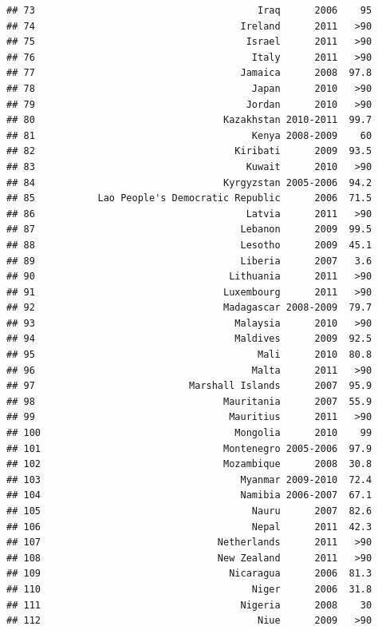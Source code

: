 \documentclass[
]{book}
\begin{document}
\begin{verbatim}
## 73                                       Iraq      2006    95
## 74                                    Ireland      2011   >90
## 75                                     Israel      2011   >90
## 76                                      Italy      2011   >90
## 77                                    Jamaica      2008  97.8
## 78                                      Japan      2010   >90
## 79                                     Jordan      2010   >90
## 80                                 Kazakhstan 2010-2011  99.7
## 81                                      Kenya 2008-2009    60
## 82                                   Kiribati      2009  93.5
## 83                                     Kuwait      2010   >90
## 84                                 Kyrgyzstan 2005-2006  94.2
## 85           Lao People's Democratic Republic      2006  71.5
## 86                                     Latvia      2011   >90
## 87                                    Lebanon      2009  99.5
## 88                                    Lesotho      2009  45.1
## 89                                    Liberia      2007   3.6
## 90                                  Lithuania      2011   >90
## 91                                 Luxembourg      2011   >90
## 92                                 Madagascar 2008-2009  79.7
## 93                                   Malaysia      2010   >90
## 94                                   Maldives      2009  92.5
## 95                                       Mali      2010  80.8
## 96                                      Malta      2011   >90
## 97                           Marshall Islands      2007  95.9
## 98                                 Mauritania      2007  55.9
## 99                                  Mauritius      2011   >90
## 100                                  Mongolia      2010    99
## 101                                Montenegro 2005-2006  97.9
## 102                                Mozambique      2008  30.8
## 103                                   Myanmar 2009-2010  72.4
## 104                                   Namibia 2006-2007  67.1
## 105                                     Nauru      2007  82.6
## 106                                     Nepal      2011  42.3
## 107                               Netherlands      2011   >90
## 108                               New Zealand      2011   >90
## 109                                 Nicaragua      2006  81.3
## 110                                     Niger      2006  31.8
## 111                                   Nigeria      2008    30
## 112                                      Niue      2009   >90

\end{verbatim}
\end{document}
